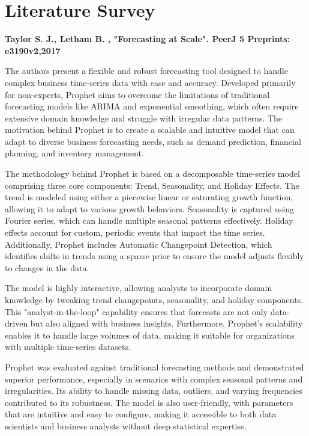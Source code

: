 \chapter{Literature Survey}

\textbf{\cite{taylor2017forecasting}Taylor S. J., Letham B. , "Forecasting at Scale". PeerJ 5 Preprints: e3190v2,2017}

The authors  present a flexible and robust forecasting tool designed to handle complex business time-series data with ease and accuracy. Developed primarily for non-experts, Prophet aims to overcome the limitations of traditional forecasting models like ARIMA and exponential smoothing, which often require extensive domain knowledge and struggle with irregular data patterns. The motivation behind Prophet is to create a scalable and intuitive model that can adapt to diverse business forecasting needs, such as demand prediction, financial planning, and inventory management.

The methodology behind Prophet is based on a decomposable time-series model comprising three core components: Trend, Seasonality, and Holiday Effects. The trend is modeled using either a piecewise linear or saturating growth function, allowing it to adapt to various growth behaviors. Seasonality is captured using Fourier series, which can handle multiple seasonal patterns effectively. Holiday effects account for custom, periodic events that impact the time series. Additionally, Prophet includes Automatic Changepoint Detection, which identifies shifts in trends using a sparse prior to ensure the model adjusts flexibly to changes in the data.

The model is highly interactive, allowing analysts to incorporate domain knowledge by tweaking trend changepoints, seasonality, and holiday components. This "analyst-in-the-loop" capability ensures that forecasts are not only data-driven but also aligned with business insights. Furthermore, Prophet’s scalability enables it to handle large volumes of data, making it suitable for organizations with multiple time-series datasets.

Prophet was evaluated against traditional forecasting methods and demonstrated superior performance, especially in scenarios with complex seasonal patterns and irregularities. Its ability to handle missing data, outliers, and varying frequencies contributed to its robustness. The model is also user-friendly, with parameters that are intuitive and easy to configure, making it accessible to both data scientists and business analysts without deep statistical expertise.

